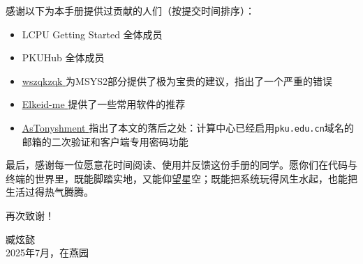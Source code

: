 \documentclass[12pt, openany]{book}
\let\oldhref\href
\renewcommand{\href}[2]{%
  \oldhref{#1}{%
    \color{blue}\underline{#2}%
    \raisebox{0.2ex}{\tiny$\nearrow$}%
  }%
}
\begin{document}
感谢以下为本手册提供过贡献的人们（按提交时间排序）：

\begin{itemize}
  \item LCPU Getting Started 全体成员
  \item PKUHub 全体成员
  \item \faGithub\href{https://github.com/wszqkzqk}{wszqkzqk}为MSYS2部分提供了极为宝贵的建议，指出了一个严重的错误
  \item \faGithub\href{https://github.com/Elkeid-me}{Elkeid-me}提供了一些常用软件的推荐
  \item \faGithub\href{https://github.com/AsTonyshment}{AsTonyshment}指出了本文的落后之处：计算中心已经启用\texttt{pku.edu.cn}域名的邮箱的二次验证和客户端专用密码功能
\end{itemize}

最后，感谢每一位愿意花时间阅读、使用并反馈这份手册的同学。愿你们在代码与终端的世界里，既能脚踏实地，又能仰望星空；既能把系统玩得风生水起，也能把生活过得热气腾腾。

再次致谢！

\vspace{2em}
\begin{flushright}
  臧炫懿 \\
  2025年7月，在燕园
\end{flushright}
\end{document}
